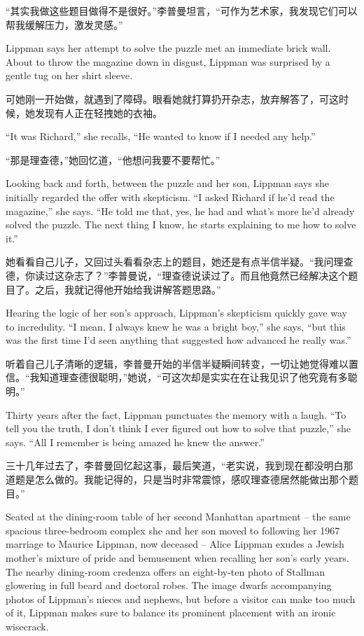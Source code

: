 \ifdefined\chs
``其实我做这些题目做得不是很好。''李普曼坦言，``可作为艺术家，我发现它们可以帮我缓解压力，激发灵感。''
\fi

\ifdefined\eng
Lippman says her attempt to solve the puzzle met an immediate brick wall. About to throw the magazine down in disgust, Lippman was surprised by a gentle tug on her shirt sleeve.
\fi

\ifdefined\chs
可她刚一开始做，就遇到了障碍。眼看她就打算扔开杂志，放弃解答了，可这时候，她发现有人正在轻拽她的衣袖。
\fi

\ifdefined\eng
``It was Richard,'' she recalls, ``He wanted to know if I needed any help.''
\fi

\ifdefined\chs
``那是理查德，''她回忆道，``他想问我要不要帮忙。''
\fi

\ifdefined\eng
Looking back and forth, between the puzzle and her son, Lippman says she initially regarded the offer with skepticism. ``I asked Richard if he'd read the magazine,'' she says. ``He told me that, yes, he had and what's more he'd already solved the puzzle. The next thing I know, he starts explaining to me how to solve it.''
\fi

\ifdefined\chs
她看看自己儿子，又回过头看看杂志上的题目，她还是有点半信半疑。``我问理查德，你读过这杂志了？''李普曼说，``理查德说读过了。而且他竟然已经解决这个题目了。之后，我就记得他开始给我讲解答题思路。''
\fi

\ifdefined\eng
Hearing the logic of her son's approach, Lippman's skepticism quickly gave way to incredulity. ``I mean, I always knew he was a bright boy,'' she says, ``but this was the first time I'd seen anything that suggested how advanced he really was.''
\fi

\ifdefined\chs
听着自己儿子清晰的逻辑，李普曼开始的半信半疑瞬间转变，一切让她觉得难以置信。``我知道理查德很聪明，''她说，``可这次却是实实在在让我见识了他究竟有多聪明。''
\fi

\ifdefined\eng
Thirty years after the fact, Lippman punctuates the memory with a laugh. ``To tell you the truth, I don't think I ever figured out how to solve that puzzle,'' she says. ``All I remember is being amazed he knew the answer.''
\fi

\ifdefined\chs
三十几年过去了，李普曼回忆起这事，最后笑道，``老实说，我到现在都没明白那道题是怎么做的。我能记得的，只是当时非常震惊，感叹理查德居然能做出那个题目。''
\fi

\ifdefined\eng
Seated at the dining-room table of her second Manhattan apartment -- the same spacious three-bedroom complex she and her son moved to following her 1967 marriage to Maurice Lippman, now deceased -- Alice Lippman exudes a Jewish mother's mixture of pride and bemusement when recalling her son's early years. The nearby dining-room credenza offers an eight-by-ten photo of Stallman glowering in full beard and doctoral robes. The image dwarfs accompanying photos of Lippman's nieces and nephews, but before a visitor can make too much of it, Lippman makes sure to balance its prominent placement with an ironic wisecrack.
\fi

